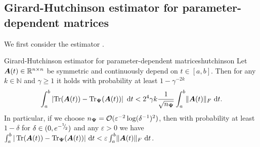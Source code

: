 \documentclass[12pt]{article}
\begin{document}
\subsection{Girard-Hutchinson estimator for parameter-dependent matrices}
\label{subsec:hutchinson}

We first consider the estimator .

\begin{theorem}{Girard-Hutchinson estimator for parameter-dependent matrices}{hutchinson}
    Let $\boldsymbol{A}(t) \in \mathbb{R}^{n \times n}$ be symmetric and continuously depend on $t \in [a, b]$. Then for any $k \in \mathbb{N}$ and $\gamma \geq 1$ it holds with probability at least $1 - \gamma^{-2k}$
    \begin{equation}
        \int_{a}^{b} \left| \operatorname{Tr}(\boldsymbol{A}(t)) - \operatorname{Tr}_{\boldsymbol{\Psi}}(\boldsymbol{A}(t)) \right| ~\mathrm{d}t < 2^4 \gamma k \frac{1}{\sqrt{n_{\boldsymbol{\Psi}}}} \int_{a}^{b} \lVert \boldsymbol{A}(t) \rVert _F  ~\mathrm{d}t.
    \end{equation}
    In particular, if we choose $n_{\boldsymbol{\Psi}} = \mathcal{O}(\varepsilon^{-2} \log(\delta^{-1})^2)$, then with probability at least $1-\delta$ for $\delta \in (0, e^{- {}^{1}{\mskip -5mu/\mskip -3mu}_{2}})$ and any $\varepsilon > 0$ we have $\int_{a}^{b} | \operatorname{Tr}(\boldsymbol{A}(t)) - \operatorname{Tr}_{\boldsymbol{\Psi}}(\boldsymbol{A}(t)) | ~\mathrm{d}t < \varepsilon \int_{a}^{b} \lVert \boldsymbol{A}(t) \rVert _F~\mathrm{d}t$.
\end{theorem}
\end{document}

